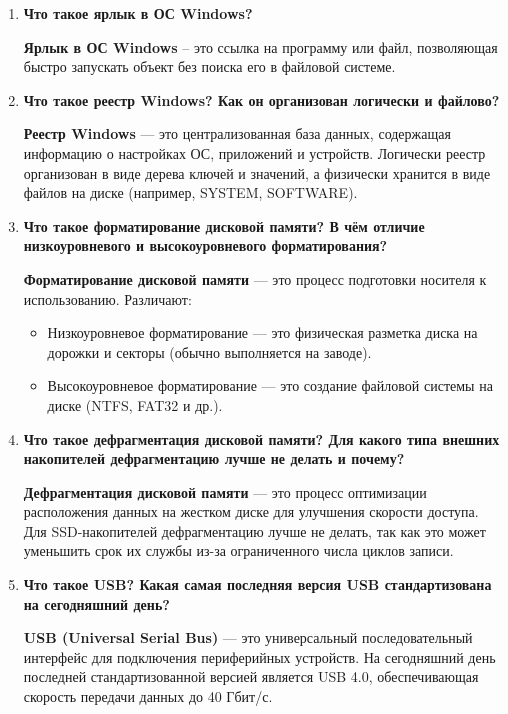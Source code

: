 \begin{enumerate}
{			и на что в этой палитре расходуются разряды в коде цвета?}\par
		\textbf{Глубина цвета} --- это количество бит,
		используемых для представления цвета каждого пикселя на экране.
		True Color использует 24 бита для кодирования цвета:
		8 бит для каждого из трёх цветовых каналов (красный, зелёный, синий).
		Это позволяет отображать более 16 миллионов цветов.
	\item \textbf{Что такое ярлык в ОС Windows?}\par
		\textbf{Ярлык в ОС Windows} -- это ссылка на программу или файл,
		позволяющая быстро запускать объект без поиска его в файловой системе.
	\item \textbf{Что такое реестр Windows?
			Как он организован логически и файлово?}\par
		\textbf{Реестр Windows} --- это централизованная база данных,
		содержащая информацию о настройках ОС, приложений и устройств.
		Логически реестр организован в виде дерева ключей и значений,
		а физически хранится в виде файлов на диске
		(например, SYSTEM, SOFTWARE).
	\item \textbf{Что такое форматирование дисковой памяти?
			В чём отличие низкоуровневого
			и высокоуровневого форматирования?}\par
		\textbf{Форматирование дисковой памяти} --- это процесс подготовки
		носителя к использованию.
		Различают:
		\begin{itemize}
			\item Низкоуровневое форматирование --- это физическая разметка
				диска на дорожки и секторы (обычно выполняется на заводе).
			\item Высокоуровневое форматирование --- это создание файловой
				системы на диске (NTFS, FAT32 и др.).
		\end{itemize}
	\item \textbf{Что такое дефрагментация дисковой памяти?
			Для какого типа внешних накопителей дефрагментацию
			лучше не делать и почему?}\par
		\textbf{Дефрагментация дисковой памяти} --- это процесс оптимизации
		расположения данных на жестком диске для улучшения скорости доступа.
		Для SSD-накопителей дефрагментацию лучше не делать,
		так как это может уменьшить срок их службы
		из-за ограниченного числа циклов записи.
	\item \textbf{Что такое USB? Какая самая последняя версия
			USB стандартизована на сегодняшний день?}\par
		\textbf{USB (Universal Serial Bus)} --- это универсальный
		последовательный интерфейс для подключения периферийных устройств.
		На сегодняшний день последней стандартизованной версией является
		USB 4.0, обеспечивающая скорость передачи данных до 40 Гбит/с.
\end{enumerate}


